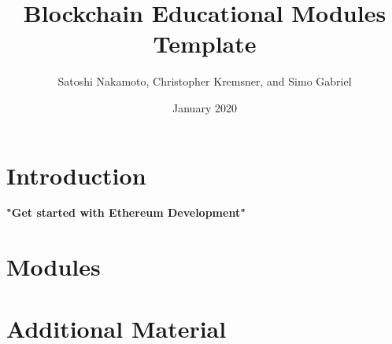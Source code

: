 \documentclass{article}
\title{Blockchain Educational Modules Template}
\author{Satoshi Nakamoto, Christopher Kremsner, and Simo Gabriel}
\date{January 2020}
\begin{document}
\maketitle
\tableofcontents
\pagebreak

\section{Introduction}
\textbf{"Get started with Ethereum Development"}%

\section{Modules}






\section{Additional Material} %
\end{document}
